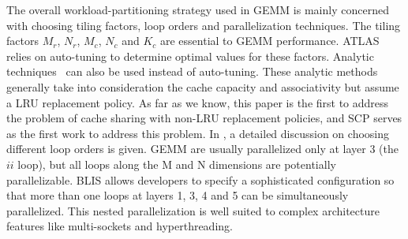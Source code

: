 The overall workload-partitioning strategy used in
GEMM is mainly concerned with choosing 
tiling factors, loop orders and parallelization
techniques.
The tiling factors $M_r$, $N_r$, $M_c$, $N_c$ and $K_c$
are essential to GEMM performance.
ATLAS~\cite{atlas} relies on auto-tuning to determine optimal
values for these factors.
Analytic techniques~\cite{analytic1,analytic2,blisanalytic} 
can also be used instead of auto-tuning.
These analytic methods generally take into consideration
the cache capacity and associativity
but assume a LRU replacement policy.
As far as we know, this paper is the first to
address the problem of cache sharing with non-LRU replacement policies,
and SCP serves as the first work to address this problem.
In \cite{gotogemm}, a detailed discussion on
choosing different loop orders is given.
GEMM are usually parallelized only at layer 3 (the $ii$ loop),
but all loops along the M and N dimensions are potentially parallelizable.
BLIS\cite{blispar} allows developers to specify a sophisticated configuration
so that more than one loops at layers 1, 3, 4 and 5
can be simultaneously parallelized.
This nested parallelization is well suited to complex architecture features
like multi-sockets and hyperthreading. 

